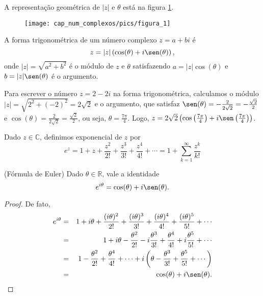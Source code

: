 A representação geométrica de $|z|$ e $\theta$ está na figura \ref{num_complexo}.
\begin{figure}[!ht]
\begin{center}
\texttt{[image: cap\_num\_complexos/pics/figura\_1]}\end{center}
\caption{\label{num_complexo}}
\end{figure}
\begin{defn}A forma trigonométrica de um número complexo $z=a+bi$ é 
\begin{equation}
z=|z|\left(\cos(\theta)+i\sen(\theta)\right),
\end{equation}
onde $|z|=\sqrt{a^2+b^2}$ é o módulo de $z$ e $\theta$ satisfazendo $a=|z|\cos(\theta)$ e $b=|z|\sen(\theta)$ é o argumento.
\end{defn}
\begin{ex}Para escrever o número $z=2-2i$ na forma trigonométrica, calculamos o módulo $|z|=\sqrt{2^2+(-2)^2}=2\sqrt{2}$ e o argumento, que satisfaz $\sen(\theta)=-\frac{2}{2\sqrt{2}}=-\frac{\sqrt{2}}{2}$ e $\cos(\theta)=\frac{2}{2\sqrt{2}}=\frac{\sqrt{2}}{2}$, ou seja, $\theta=\frac{7\pi}{4}$. Logo, $z=2\sqrt{2}\left(\cos\left(\frac{7\pi}{4}\right)+i\sen\left(\frac{7\pi}{4}\right)\right)$. 
\end{ex}
\begin{defn}Dado $z\in\mathbb{C}$, definimos exponencial de $z$ por
\begin{equation}
e^z=1+z+\frac{z^2}{2!}+\frac{z^3}{3!}+\frac{z^4}{4!}+\cdots=1+\sum_{k=1}^\infty \frac{z^k}{k!}
\end{equation}
\end{defn}
\begin{prop}(Fórmula de Euler) Dado $\theta\in\mathbb{R}$, vale a identidade
\begin{equation}
e^{i\theta}=\cos(\theta)+i\sen(\theta).
\end{equation}
\end{prop}
\begin{proof}
De fato,
\begin{eqnarray*}
e^{i\theta}&=&1+i\theta+\frac{(i \theta)^2}{2!}+\frac{(i\theta)^3}{3!}+\frac{(i\theta)^4}{4!}+\frac{(i\theta)^5}{5!}+\cdots\\
&=&1+i\theta-\frac{\theta^2}{2!}-i\frac{\theta^3}{3!}+\frac{\theta^4}{4!}+i\frac{\theta^5}{5!}+\cdots\\
&=&1-\frac{\theta^2}{2!}+\frac{\theta^4}{4!}+\cdots    +i\left(\theta-\frac{\theta^3}{3!}+\frac{\theta^5}{5!}+\cdots\right)\\
&=&\cos(\theta)  + i\sen(\theta).
\end{eqnarray*}
\end{proof}
